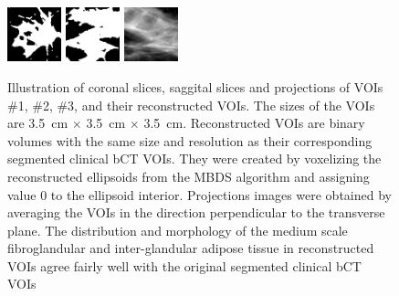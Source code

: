 \documentclass[journal]{IEEEtran}
\begin{document}
\begin{figure}[!htb]
   \includegraphics[width=0.14\textwidth]
  {figure/all/dataset_11/roi_coronal}
  \includegraphics[width=0.14\textwidth]
  {figure/all/dataset_11/roi_saggital}
  \includegraphics[width=0.14\textwidth]
  {figure/all/dataset_11/proj_roi}


  \caption{Illustration of coronal slices, saggital slices and
    projections of VOIs \#1, \#2, \#3, and their reconstructed
    VOIs. The sizes of the VOIs are \SI{3.5}{\cm} $\times$
    \SI{3.5}{\cm} $\times$ \SI{3.5}{\cm}. Reconstructed VOIs are
    binary volumes with the same size and resolution as their
    corresponding segmented clinical bCT VOIs. They were created by
    voxelizing the reconstructed ellipsoids from the MBDS algorithm
    and assigning value 0 to the ellipsoid interior. Projections
    images were obtained by averaging the VOIs in the direction
    perpendicular to the transverse plane. The distribution and
    morphology of the medium scale fibroglandular and inter-glandular
    adipose tissue in reconstructed VOIs agree fairly well with the
    original segmented clinical bCT VOIs}
  \label{fig:bct-datasets-recon}

\end{figure}
\end{document}

